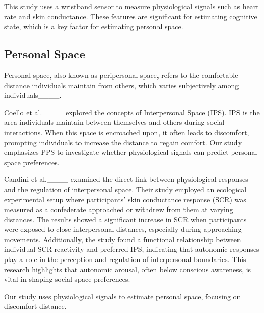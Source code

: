 This study uses a wristband sensor to measure physiological signals such as heart rate and skin conductance.
These features are significant for estimating cognitive state, which is a key factor for estimating personal space.

\subsection{Personal Space}
Personal space, also known as peripersonal space, refers to the comfortable distance individuals maintain from others, which varies subjectively among individuals____.

Coello et al.____ explored the concepts of Interpersonal Space (IPS).
IPS is the area individuals maintain between themselves and others during social interactions. 
When this space is encroached upon, it often leads to discomfort, prompting individuals to increase the distance to regain comfort.
Our study emphasizes PPS to investigate whether physiological signals can predict personal space preferences.

Candini et al.____ examined the direct link between physiological responses and the regulation of interpersonal space. 
Their study employed an ecological experimental setup where participants' skin conductance response (SCR) was measured as a confederate approached or withdrew from them at varying distances.
The results showed a significant increase in SCR when participants were exposed to close interpersonal distances, especially during approaching movements.
Additionally, the study found a functional relationship between individual SCR reactivity and preferred IPS, indicating that autonomic responses play a role in the perception and regulation of interpersonal boundaries.
This research highlights that autonomic arousal, often below conscious awareness, is vital in shaping social space preferences.

Our study uses physiological signals to estimate personal space, focusing on discomfort distance.